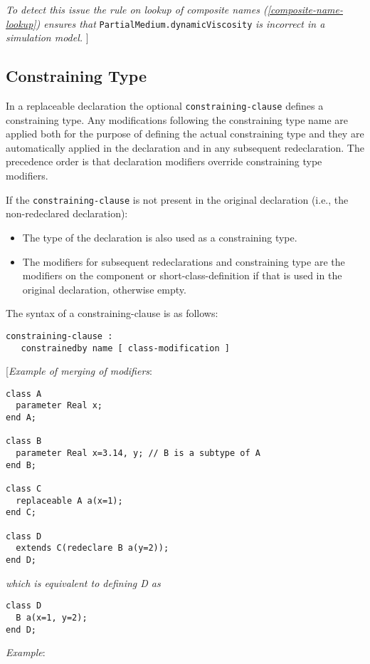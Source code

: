 \emph{To detect this issue the rule on lookup of composite names (\autoref{composite-name-lookup})
ensures that} \lstinline[basicstyle=\ttfamily]!PartialMedium.dynamicViscosity! \emph{is incorrect in a
simulation model.}
{]}

\subsection{Constraining Type}

In a replaceable declaration the optional \lstinline[basicstyle=\ttfamily]!constraining-clause! defines a
constraining type. Any modifications following the constraining type
name are applied both for the purpose of defining the actual
constraining type and they are automatically applied in the declaration
and in any subsequent redeclaration. The precedence order is that
declaration modifiers override constraining type modifiers.

If the \lstinline[basicstyle=\ttfamily]!constraining-clause! is not present in the original declaration
(i.e., the non-redeclared declaration):

\begin{itemize}
\item
  The type of the declaration is also used as a constraining type.
\item
  The modifiers for subsequent redeclarations and constraining type are
  the modifiers on the component or short-class-definition if that is
  used in the original declaration, otherwise empty.
\end{itemize}

The syntax of a constraining-clause is as follows:
\begin{lstlisting}[language=grammar]
constraining-clause :
   constrainedby name [ class-modification ]
\end{lstlisting}
{[}\emph{Example of merging of modifiers}:
\begin{lstlisting}[language=modelica]
class A
  parameter Real x;
end A;

class B
  parameter Real x=3.14, y; // B is a subtype of A
end B;

class C
  replaceable A a(x=1);
end C;

class D
  extends C(redeclare B a(y=2));
end D;
\end{lstlisting}

\emph{which is equivalent to defining D as }
\begin{lstlisting}[language=modelica]
class D
  B a(x=1, y=2);
end D;
\end{lstlisting}
\emph{Example}:


